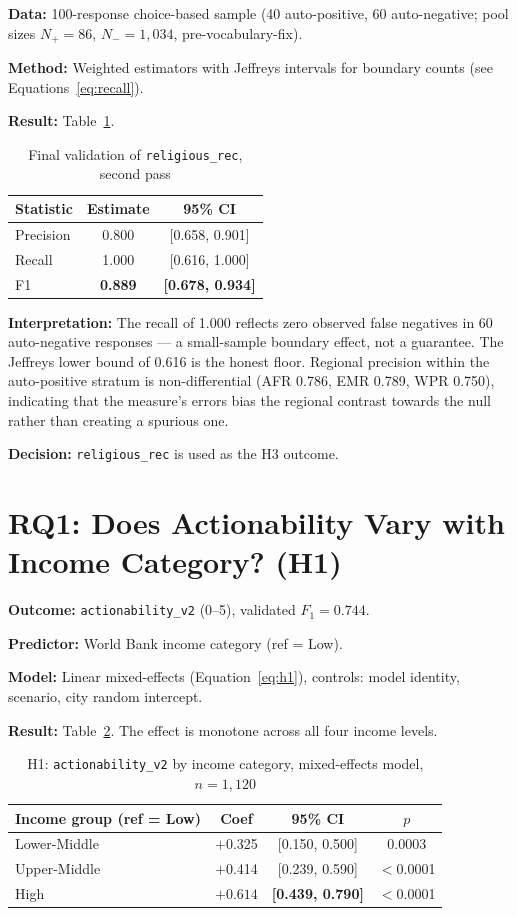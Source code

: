 \textbf{Data:} 100-response choice-based sample (40 auto-positive, 60 auto-negative; pool sizes $N_+ = 86$, $N_- = 1{,}034$, pre-vocabulary-fix).

\textbf{Method:} Weighted estimators with Jeffreys intervals for boundary counts (see Equations~\ref{eq:recall}).

\textbf{Result:} Table~\ref{tab:val3}.

\begin{table}[H]
\centering
\caption{Final validation of \texttt{religious\_rec}, second pass}
\label{tab:val3}
\begin{tabular}{lcc}
\toprule
Statistic & Estimate & 95\% CI \\
\midrule
Precision & 0.800 & [0.658, 0.901] \\
Recall & 1.000 & [0.616, 1.000] \\
F1 & \textbf{0.889} & \textbf{[0.678, 0.934]} \\
\bottomrule
\end{tabular}
\end{table}

\textbf{Interpretation:} The recall of 1.000 reflects zero observed false negatives in 60 auto-negative responses --- a small-sample boundary effect, not a guarantee. The Jeffreys lower bound of 0.616 is the honest floor. Regional precision within the auto-positive stratum is non-differential (AFR 0.786, EMR 0.789, WPR 0.750), indicating that the measure's errors bias the regional contrast towards the null rather than creating a spurious one.

\textbf{Decision:} \texttt{religious\_rec} is used as the H3 outcome.

\section{RQ1: Does Actionability Vary with Income Category? (H1)}

\textbf{Outcome:} \texttt{actionability\_v2} (0--5), validated $F_1 = 0.744$.

\textbf{Predictor:} World Bank income category (ref = Low).

\textbf{Model:} Linear mixed-effects (Equation~\ref{eq:h1}), controls: model identity, scenario, city random intercept.

\textbf{Result:} Table~\ref{tab:h1}. The effect is monotone across all four income levels.

\begin{table}[H]
\centering
\caption{H1: \texttt{actionability\_v2} by income category, mixed-effects model, $n = 1{,}120$}
\label{tab:h1}
\begin{tabular}{lccc}
\toprule
Income group (ref = Low) & Coef & 95\% CI & $p$ \\
\midrule
Lower-Middle & $+$0.325 & [0.150, 0.500] & 0.0003 \\
Upper-Middle & $+$0.414 & [0.239, 0.590] & $<$0.0001 \\
High & $\mathbf{+0.614}$ & \textbf{[0.439, 0.790]} & $<$0.0001 \\
\bottomrule
\end{tabular}
\end{table}

